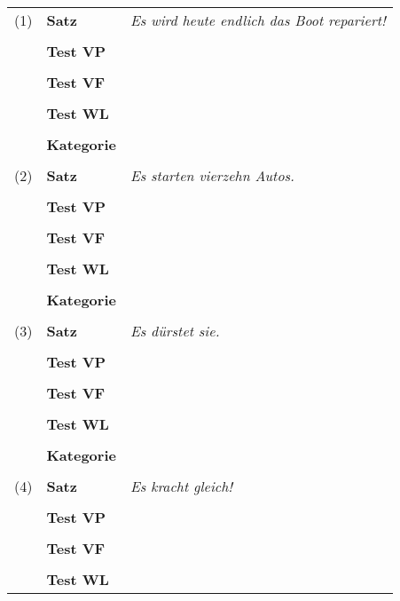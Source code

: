 \begin{center}
  \begin{longtable}[h]{clp{}}
    (1) & \textbf{Satz} & \textit{Es wird heute endlich das Boot repariert!} \\
    &&\\
    & \textbf{Test VP} & \\\cline{3-3}
    &&\\
    & \textbf{Test VF} & \\\cline{3-3}
    &&\\
    & \textbf{Test WL} & \\\cline{3-3}
    &&\\
    & \textbf{Kategorie} & \\\cline{3-3}
    &&\\
    (2) & \textbf{Satz} & \textit{Es starten vierzehn Autos.} \\
    &&\\
    & \textbf{Test VP} & \\\cline{3-3}
    &&\\
    & \textbf{Test VF} & \\\cline{3-3}
    &&\\
    & \textbf{Test WL} & \\\cline{3-3}
    &&\\
    & \textbf{Kategorie} & \\\cline{3-3}
    &&\\
    (3) & \textbf{Satz} & \textit{Es dürstet sie.} \\
    &&\\
    & \textbf{Test VP} & \\\cline{3-3}
    &&\\
    & \textbf{Test VF} & \\\cline{3-3}
    &&\\
    & \textbf{Test WL} & \\\cline{3-3}
    &&\\
    & \textbf{Kategorie} & \\\cline{3-3}
    &&\\
 \newpage
    (4) & \textbf{Satz} & \textit{Es kracht gleich!} \\
    &&\\
    & \textbf{Test VP} & \\\cline{3-3}
    &&\\
    & \textbf{Test VF} & \\\cline{3-3}
    &&\\
    & \textbf{Test WL} & \\\cline{3-3}

\end{longtable}
\end{center}
